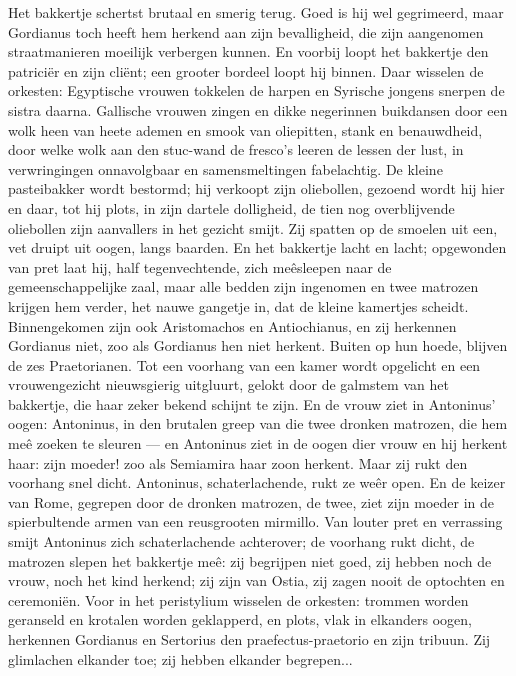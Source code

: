 \documentclass[a4paper, 12pt, oneside, dutch]{article}
\begin{document}
Het bakkertje schertst brutaal en smerig terug. Goed is hij wel gegrimeerd, maar Gordianus toch heeft hem herkend aan zijn bevalligheid, die zijn aangenomen straatmanieren moeilijk verbergen kunnen. En voorbij loopt het bakkertje den patriciër en zijn cliënt; een grooter bordeel loopt hij binnen. Daar wisselen de orkesten: Egyptische vrouwen tokkelen de harpen en Syrische jongens snerpen de sistra daarna. Gallische vrouwen zingen en dikke negerinnen buikdansen door een wolk heen van heete ademen en smook van oliepitten, stank en benauwdheid, door welke wolk aan den stuc-wand de fresco's leeren de lessen der lust, in verwringingen onnavolgbaar en samensmeltingen fabelachtig. De kleine pasteibakker wordt bestormd; hij verkoopt zijn oliebollen, gezoend wordt hij hier en daar, tot hij plots, in zijn dartele dolligheid, de tien nog overblijvende oliebollen zijn aanvallers in het gezicht smijt. Zij spatten op de smoelen uit een, vet druipt uit oogen, langs baarden. En het bakkertje lacht en lacht; opgewonden van pret laat hij, half tegenvechtende, zich meêsleepen naar de gemeenschappelijke zaal, maar alle bedden zijn ingenomen en twee matrozen krijgen hem verder, het nauwe gangetje in, dat de kleine kamertjes scheidt. Binnengekomen zijn ook Aristomachos en Antiochianus, en zij herkennen Gordianus niet, zoo als Gordianus hen niet herkent. Buiten op hun hoede, blijven de zes Praetorianen. Tot een voorhang van een kamer wordt opgelicht en een vrouwengezicht nieuwsgierig uitgluurt, gelokt door de galmstem van het bakkertje, die haar zeker bekend schijnt te zijn. En de vrouw ziet in Antoninus' oogen: Antoninus, in den brutalen greep van die twee dronken matrozen, die hem meê zoeken te sleuren --- en Antoninus ziet in de oogen dier vrouw en hij herkent haar: zijn moeder! zoo als Semiamira haar zoon herkent. Maar zij rukt den voorhang snel dicht. Antoninus, schaterlachende, rukt ze weêr open. En de keizer van Rome, gegrepen door de dronken matrozen, de twee, ziet zijn moeder in de spierbultende armen van een reusgrooten mirmillo. Van louter pret en verrassing smijt Antoninus zich schaterlachende achterover; de voorhang rukt dicht, de matrozen slepen het bakkertje meê: zij begrijpen niet goed, zij hebben noch de vrouw, noch het kind herkend; zij zijn van Ostia, zij zagen nooit de optochten en ceremoniën. Voor in het peristylium wisselen de orkesten: trommen worden geranseld en krotalen worden geklapperd, en plots, vlak in elkanders oogen, herkennen Gordianus en Sertorius den praefectus-praetorio en zijn tribuun. Zij glimlachen elkander toe; zij hebben elkander begrepen...
\end{document}
